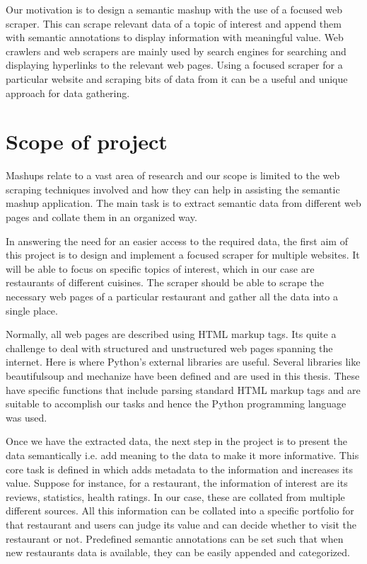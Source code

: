 Our motivation is to design a semantic mashup with the use of a focused web scraper. This can scrape relevant data of a topic of interest and append them with semantic annotations to display information with meaningful value. Web crawlers and web scrapers are mainly used by search engines for searching and displaying hyperlinks to the relevant web pages. Using a focused scraper for a particular website and scraping bits of data from it can be a useful and unique approach for data gathering.

\section{Scope of project}
Mashups relate to a vast area of research and our scope is limited to the web scraping techniques involved and how they can help in assisting the semantic mashup application. The main task is to extract semantic data from different web pages and collate them in an organized way.

In answering the need for an easier access to the required data, the first aim of this project is to design and implement a focused scraper for multiple websites. It will be able to focus on specific topics of interest, which in our case are restaurants of different cuisines. The scraper should be able to scrape the necessary web pages of a particular restaurant and gather all the data into a single place.

Normally, all web pages are described using HTML markup tags. Its quite a challenge to deal with structured and unstructured web pages spanning the internet. Here is where Python’s external libraries are useful. Several libraries like beautifulsoup \cite{5} and mechanize \cite{6} have been defined and are used in this thesis. These have specific functions that include parsing standard HTML markup tags and are suitable to accomplish our tasks and hence the Python programming language was used.

Once we have the extracted data, the next step in the project is to present the data semantically i.e. add meaning to the data to make it more informative. This core task is defined in \cite{1} which adds metadata to the information and increases its value. Suppose for instance, for a restaurant, the information of interest are its reviews, statistics, health ratings. In our case, these are collated from multiple different sources. All this information can be collated into a specific portfolio for that restaurant and users can judge its value and can decide whether to visit the restaurant or not. Predefined semantic annotations can be set such that when new restaurants data is available, they can be easily appended and categorized.

